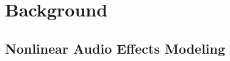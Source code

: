 \section{Background}
\label{sec:background}
\subsection{Nonlinear Audio Effects Modeling}
\label{sec:back-nnlinafx-modeling}


